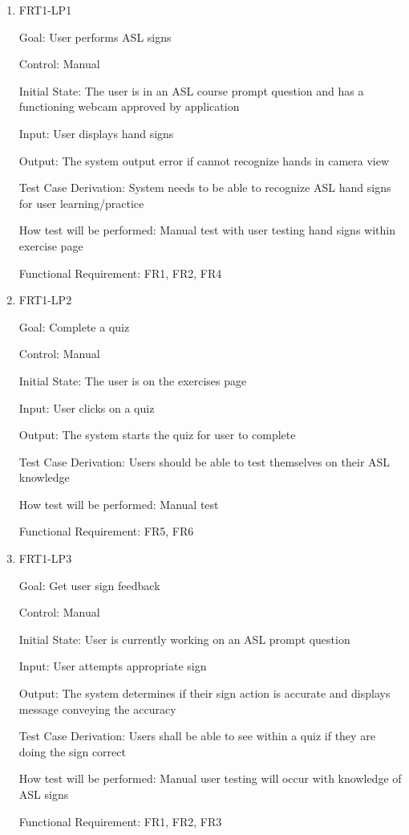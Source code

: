 \documentclass[12pt, titlepage]{article}
\begin{document}
\begin{enumerate}

\item{FRT1-LP1}

Goal: User performs ASL signs

Control: Manual
					
Initial State: The user is in an ASL course prompt question and has a functioning webcam approved by application
					
Input: User displays hand signs
					
Output: The system output error if cannot recognize hands in camera view

Test Case Derivation: System needs to be able to recognize ASL hand signs for user learning/practice
					
How test will be performed: Manual test with user testing hand signs within exercise page

Functional Requirement: FR1, FR2, FR4

\item{FRT1-LP2}

Goal: Complete a quiz

Control: Manual
					
Initial State: The user is on the exercises page
					
Input: User clicks on a quiz
					
Output: The system starts the quiz for user to complete

Test Case Derivation: Users should be able to test themselves on their ASL knowledge
					
How test will be performed: Manual test 

Functional Requirement: FR5, FR6

\item{FRT1-LP3}

Goal: Get user sign feedback

Control: Manual
					
Initial State: User is currently working on an ASL prompt question

Input: User attempts appropriate sign
					
Output: The system determines if their sign action is accurate and displays message conveying the accuracy

Test Case Derivation: Users shall be able to see within a quiz if they are doing the sign correct
					
How test will be performed: Manual user testing will occur with knowledge of ASL signs

Functional Requirement: FR1, FR2, FR3

\end{enumerate}
\end{document}
